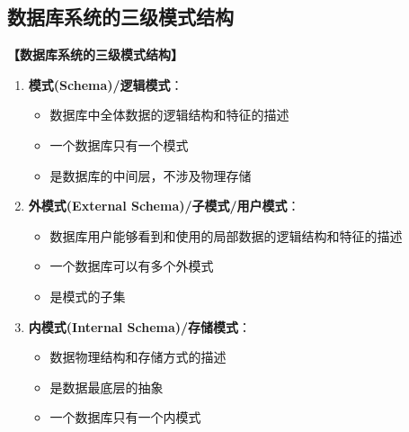 \documentclass[12pt, a4paper]{article}
\newenvironment{bluebox}[1]{%
  \begin{trivlist}
  \item[\hskip\labelsep \textbf{#1}]
  \setlength{\parskip}{0.5ex}
  \setlength{\itemsep}{0.5ex}
}{%
  \end{trivlist}
}
\begin{document}
\subsection{数据库系统的三级模式结构}

\begin{bluebox}{三级模式结构}
	\textbf{【数据库系统的三级模式结构】}

	\begin{enumerate}[leftmargin=*, label=\textbf{\arabic*.}]
		\item \textbf{模式(Schema)/逻辑模式}：
		      \begin{itemize}
			      \item 数据库中全体数据的逻辑结构和特征的描述
			      \item 一个数据库只有一个模式
			      \item 是数据库的中间层，不涉及物理存储
		      \end{itemize}

		\item \textbf{外模式(External Schema)/子模式/用户模式}：
		      \begin{itemize}
			      \item 数据库用户能够看到和使用的局部数据的逻辑结构和特征的描述
			      \item 一个数据库可以有多个外模式
			      \item 是模式的子集
		      \end{itemize}

		\item \textbf{内模式(Internal Schema)/存储模式}：
		      \begin{itemize}
			      \item 数据物理结构和存储方式的描述
			      \item 是数据最底层的抽象
			      \item 一个数据库只有一个内模式
		      \end{itemize}
	\end{enumerate}
\end{bluebox}
\end{document}
